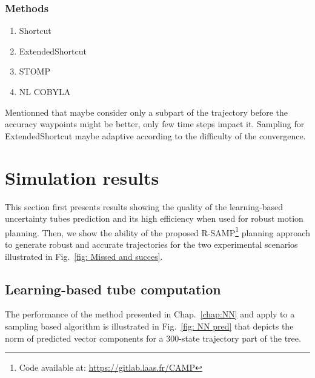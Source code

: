 \subsubsection{Methods}

\begin{enumerate}
    \item Shortcut
    \item ExtendedShortcut
    \item STOMP
    \item NL COBYLA
\end{enumerate}

Mentionned that maybe consider only a subpart of the trajectory before the accuracy waypoints might be better, only few time steps impact it.
Sampling for ExtendedShortcut maybe adaptive according to the difficulty of the convergence.

\section{Simulation results} \label{sec:SimuResults}

This section first presents results showing the quality of the learning-based uncertainty tubes prediction and its high efficiency when used for robust motion planning. 
Then, we show the ability of the proposed R-SAMP\footnote{Code available at: \href{https://gitlab.laas.fr/CAMP}{https://gitlab.laas.fr/CAMP}} planning approach to generate robust 
and accurate trajectories for the two experimental scenarios illustrated in Fig.~\ref{fig: Missed and succes}.

\subsection{Learning-based tube computation} \label{sec:NNresult}

The performance of the method presented in Chap.~\ref{chap:NN} and apply to a sampling based algorithm is illustrated in Fig.~\ref{fig: NN pred} that depicts the norm of predicted vector components for a 300-state trajectory part of the tree.


